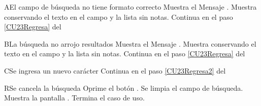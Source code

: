 
\begin{UCtrayectoriaA}{A}{El campo de búsqueda no tiene formato correcto}
    \UCpaso Muestra el Mensaje \textbf{}.
    \UCpaso Muestra  conservando el texto en el campo y la lista sin notas.
	\UCpaso Continua en el paso \ref{CU23Regresa} del 
\end{UCtrayectoriaA}
		
\begin{UCtrayectoriaA}{B}{La búsqueda no arrojo resultados}
    \UCpaso Muestra el Mensaje \textbf{}.
    \UCpaso Muestra  conservando el texto en el campo y la lista sin notas.
	\UCpaso Continua en el paso \ref{CU23Regresa} del 	
\end{UCtrayectoriaA}

\begin{UCtrayectoriaA}{C}{Se ingresa un nuevo carácter}
    \UCpaso Continua en el paso \ref{CU23Regresa2} del 
\end{UCtrayectoriaA}

\begin{UCtrayectoriaA}{R}{Se cancela la búsqueda}
	\UCpaso[\UCactor] Oprime el botón .
	\UCpaso Se limpia el campo de búsqueda.
	\UCpaso Muestra la pantalla .
	\UCpaso Termina el caso de uso.
\end{UCtrayectoriaA}
